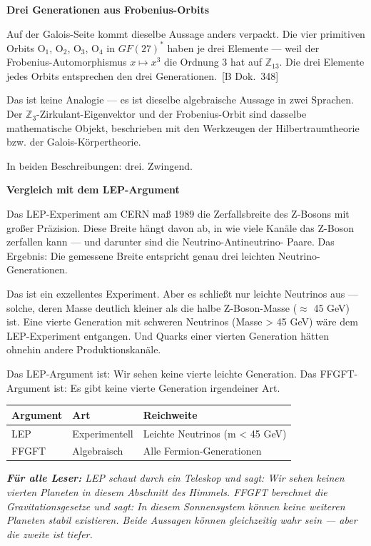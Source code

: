 \documentclass[11pt,oneside]{book}
\newcommand{\status}[1]{\penalty10000\,{\scriptsize\textcolor{gray!60}{[#1]}}}
\newenvironment{laierspur}{%
  \par\vspace{4pt}%
  \noindent\small\itshape\color{blue!60!black}%
  \textbf{Für alle Leser:}\enspace\ignorespaces}{%
  \par\vspace{4pt}\normalsize\normalfont\normalcolor}
\begin{document}
\textbf{Drei Generationen aus Frobenius-Orbits}


Auf der Galois-Seite kommt dieselbe Aussage anders verpackt. Die vier
primitiven Orbits O$_1$, O$_2$, O$_3$, O$_4$ in $GF(27)^*$ haben je drei Elemente —
weil der Frobenius-Automorphismus $x \mapsto x^3$ die Ordnung 3 hat auf $\mathbb{Z}_{13}$.
Die drei Elemente jedes Orbits entsprechen den drei Generationen. \status{B Dok.~348}


Das ist keine Analogie — es ist dieselbe algebraische Aussage in zwei
Sprachen. Der $\mathbb{Z}_3$-Zirkulant-Eigenvektor und der Frobenius-Orbit sind
dasselbe mathematische Objekt, beschrieben mit den Werkzeugen der
Hilbertraumtheorie bzw. der Galois-Körpertheorie.


In beiden Beschreibungen: drei. Zwingend.


\textbf{Vergleich mit dem LEP-Argument}


Das LEP-Experiment am CERN maß 1989 die Zerfallsbreite des Z-Bosons
mit großer Präzision. Diese Breite hängt davon ab, in wie viele Kanäle
das Z-Boson zerfallen kann — und darunter sind die Neutrino-Antineutrino-
Paare. Das Ergebnis: Die gemessene Breite entspricht genau drei leichten
Neutrino-Generationen.


Das ist ein exzellentes Experiment. Aber es schließt nur leichte Neutrinos
aus — solche, deren Masse deutlich kleiner als die halbe Z-Boson-Masse
($\approx$ 45 GeV) ist. Eine vierte Generation mit schweren Neutrinos (Masse > 45
GeV) wäre dem LEP-Experiment entgangen. Und Quarks einer vierten Generation
hätten ohnehin andere Produktionskanäle.


Das LEP-Argument ist: Wir sehen keine vierte leichte Generation.
Das FFGFT-Argument ist: Es gibt keine vierte Generation irgendeiner Art.


\begin{center}
\small
\begin{tabular}{lp{1.5cm}p{3.5cm}}
\toprule
Argument & Art & Reichweite \\
\midrule
LEP & Experimentell & Leichte Neutrinos (m < 45 GeV) \\
FFGFT & Algebraisch & Alle Fermion-Generationen \\
\bottomrule
\end{tabular}
\end{center}

\begin{laierspur}
LEP schaut durch ein Teleskop und sagt: Wir sehen keinen
vierten Planeten in diesem Abschnitt des Himmels. FFGFT berechnet die
Gravitationsgesetze und sagt: In diesem Sonnensystem können keine weiteren
Planeten stabil existieren. Beide Aussagen können gleichzeitig wahr sein —
aber die zweite ist tiefer.
\end{laierspur}
\end{document}
